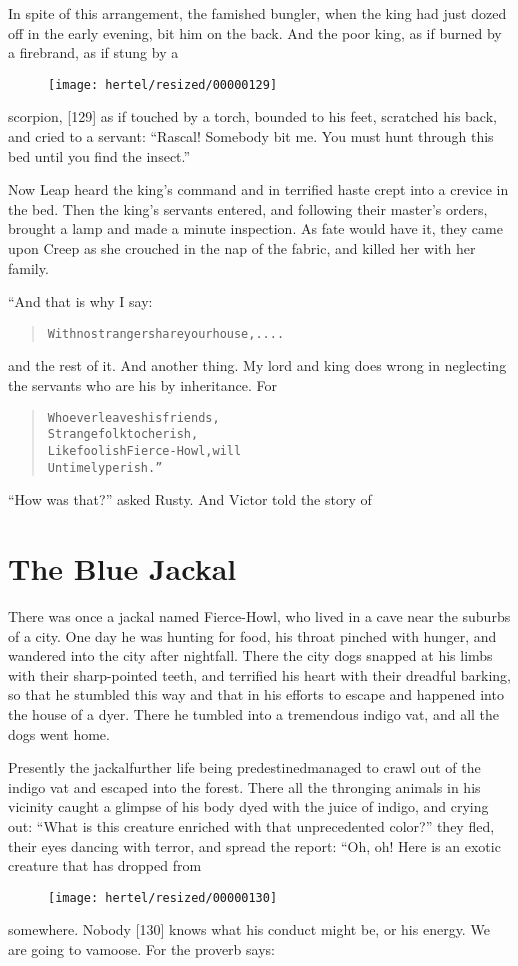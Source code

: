 \documentclass[article, twoside, 10pt]{memoir}
\renewenvironment{verbatim}{%
\begin{quote}%
\vskip -10pt%
\begin{alltt}\normalfont\small}{\end{alltt}%
\end{quote}%
\vskip -10pt
} %
\begin{document}
In spite of this arrangement, the famished bungler, when the king
had just dozed off in the early evening, bit him on the back. And
the poor king, as if burned by a firebrand, as if stung by a
\begin{figure}[p]\texttt{[image: hertel/resized/00000129]}\end{figure}scorpion, [129] as if touched by a torch, bounded to his feet,
scratched his back, and cried to a servant:
``Rascal! Somebody bit me. You must hunt through this bed until you find the insect.''

Now Leap heard the king's command and in terrified haste crept into
a crevice in the bed. Then the king's servants entered, and
following their master's orders, brought a lamp and made a minute
inspection. As fate would have it, they came upon Creep as she
crouched in the nap of the fabric, and killed her with her family.

“And that is why I say:

\begin{verbatim}
With no stranger share your house, ....
\end{verbatim}
and the rest of it. And another thing. My lord and king does wrong
in neglecting the servants who are his by inheritance. For

\begin{verbatim}
Whoever leaves his friends,
    Strange folk to cherish,
Like foolish Fierce-Howl, will
    Untimely perish.”
\end{verbatim}
``How was that?'' asked Rusty. And Victor told the story of

\chapter{The Blue Jackal}

There was once a jackal named Fierce-Howl, who lived in a cave near
the suburbs of a city. One day he was hunting for food, his throat
pinched with hunger, and wandered into the city after nightfall.
There the city dogs snapped at his limbs with their sharp-pointed
teeth, and terrified his heart with their dreadful barking, so that
he stumbled this way and that in his efforts to escape and happened
into the house of a dyer. There he tumbled into a tremendous indigo
vat, and all the dogs went home.

Presently the jackal{\textemdash}further life being predestined{\textemdash}managed to
crawl out of the indigo vat and escaped into the forest. There all
the thronging animals in his vicinity caught a glimpse of his body
dyed with the juice of indigo, and crying out:
``What is this creature enriched with that unprecedented color?''
they fled, their eyes dancing with terror, and spread the report:
“Oh, oh! Here is an exotic creature that has dropped from
\begin{figure}[p]\texttt{[image: hertel/resized/00000130]}\end{figure}somewhere. Nobody [130] knows what his conduct might be, or his
energy. We are going to vamoose. For the proverb says:
\end{document}

